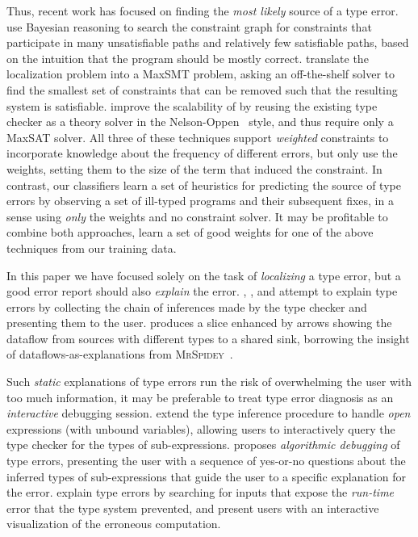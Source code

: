 Thus, recent work has focused on finding the \emph{most likely} source
of a type error.
%
\citet{Zhang2014-lv} use Bayesian reasoning to search the constraint
graph for constraints that participate in many unsatisfiable paths and
relatively few satisfiable paths, based on the intuition that the
program should be mostly correct.
%
\citet{Pavlinovic2014-mr} translate the localization problem into a
MaxSMT problem, asking an off-the-shelf solver to find the smallest
set of constraints that can be removed such that the resulting system is
satisfiable.
%
\citet{Loncaric2016-uk} improve the scalability of
\citeauthor{Pavlinovic2014-mr} by reusing the existing type checker as
a theory solver in the Nelson-Oppen~\citeyear{Nelson1979-td}
style, and thus require only a MaxSAT solver.
%
All three of these techniques support \emph{weighted} constraints to
incorporate knowledge about the frequency of different errors,
but only \citeauthor{Pavlinovic2014-mr} use the weights, setting them to
the size of the term that induced the constraint.
%
In contrast, our classifiers learn a set of heuristics for predicting
the source of type errors by observing a set of ill-typed programs and
their subsequent fixes, in a sense using \emph{only} the weights and no
constraint solver.
%
It may be profitable to combine both approaches, \ie learn a set of good
weights for one of the above techniques from our training data.

In this paper we have focused solely on the task of \emph{localizing} a
type error, but a good error report should also \emph{explain} the
error.
%
\citet{Wand1986-nw}, \citet{Beaven1993-hb}, and \citet{Duggan1996-by}
attempt to explain type errors by collecting the chain of inferences
made by the type checker %
and presenting them to the user.
%
%
\citet{Gast2004-zd} produces a slice enhanced by arrows
showing the dataflow from sources with different types to a
shared sink, borrowing the insight of dataflows-as-explanations from
\textsc{MrSpidey}~\citep{Flanagan1996-bu}.

Such \emph{static} explanations of type errors run the risk of
overwhelming the user with too much information, it may be preferable to
treat type error diagnosis as an \emph{interactive} debugging session.
%
\citet{Bernstein1995-yj} extend the type inference procedure to handle
\emph{open} expressions (\ie with unbound variables), allowing users to
interactively query the type checker for the types of sub-expressions.
%
\citet{Chitil2001-td} proposes \emph{algorithmic debugging} of type
errors, presenting the user with a sequence of yes-or-no questions about
the inferred types of sub-expressions that guide the user to a specific
explanation for the error.
%
\citet{Seidel2016-ul} explain type errors by searching for inputs that
expose the \emph{run-time} error that the type system prevented, and
present users with an interactive visualization of the erroneous
computation.

